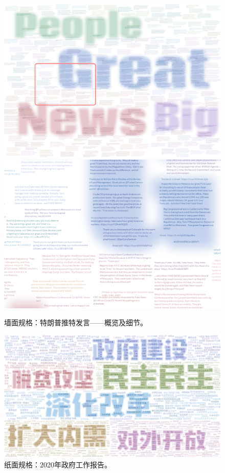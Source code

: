 \begin{figure}[htbp]
	\centering
		\includegraphics[width=\textwidth]{figures/trump_crop.png}\\
		\includegraphics[width=\textwidth]{figures/trump_small.png}

	\caption{墙面规格：特朗普推特发言——概览及细节。}
		\label{fig:wall}

\end{figure}

\begin{figure}[htbp]
	\centering
	\includegraphics[height=0.95\textheight]{figures/gov_paper.png}
	\caption{纸面规格：2020年政府工作报告。}
	\label{fig:gov}
\end{figure}

